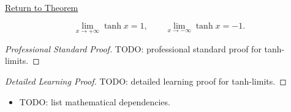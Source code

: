 \newpage
{}
\label{prf:tanh-limits}

\begin{remark*}[Return]
\hyperref[prop:tanh-limits]{Return to Theorem}
\end{remark*}

\begin{theorem*}[Limits of $$]
\[
  \lim_{x \to +\infty} \tanh x = 1,
  \qquad
  \lim_{x \to -\infty} \tanh x = -1.
\]

\smallskip\noindent
\end{theorem*}

\begin{proof}[Professional Standard Proof]
\LRAProofBodyStart
TODO: professional standard proof for tanh-limits.
\end{proof}

\begin{proof}[Detailed Learning Proof]
\LRAProofBodyStart
TODO: detailed learning proof for tanh-limits.
\end{proof}

\begin{remark*}
\end{remark*}

\begin{dependencies}
\begin{itemize}
  \item TODO: list mathematical dependencies.
\end{itemize}
\end{dependencies}

\clearpage
